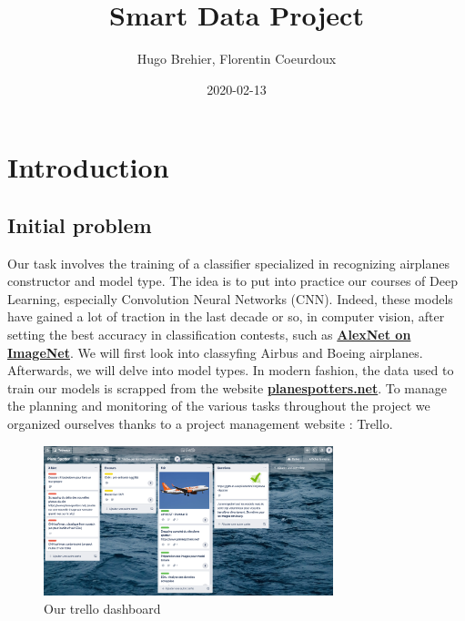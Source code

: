 \documentclass[]{book}
\title{Smart Data Project}
\author{Hugo Brehier, Florentin Coeurdoux}
\date{2020-02-13}
\begin{document}
\maketitle

{
\setcounter{tocdepth}{1}
\tableofcontents
}
\hypertarget{introduction}{%
\chapter{Introduction}\label{introduction}}

\hypertarget{initial-problem}{%
\section{Initial problem}\label{initial-problem}}

Our task involves the training of a classifier specialized in recognizing airplanes constructor and model type.
The idea is to put into practice our courses of Deep Learning, especially Convolution Neural Networks (CNN).
Indeed, these models have gained a lot of traction in the last decade or so, in computer vision, after setting
the best accuracy in classification contests, such as \href{https://mc.ai/paper-review-of-alexnet-caffenet-winner-in-ilsvrc-2012-image-classification/}{\textbf{AlexNet on ImageNet}}.
We will first look into classyfing Airbus and Boeing airplanes. Afterwards, we will delve into model types.
In modern fashion, the data used to train our models is scrapped from the website \href{https://www.planespotters.net/}{\textbf{planespotters.net}}.
To manage the planning and monitoring of the various tasks throughout the project we organized ourselves thanks to a project management website : Trello.

\begin{figure}
\centering
\includegraphics[width=0.75\textwidth,height=\textheight]{trello.png}
\caption{Our trello dashboard}
\end{figure}

\clearpage
\end{document}
